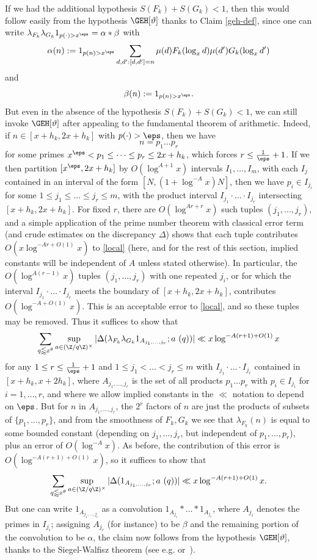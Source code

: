 If we had the additional hypothesis $S(F_k) + S(G_k) < 1$, then this would follow easily from the hypothesis $\GEH[\vartheta]$ thanks to Claim \ref{geh-def}, since one can write $\lambda_{F_k} \lambda_{G_k} 1_{p(\cdot) > x^\eps} = \alpha \ast \beta$ with
$$ \alpha(n) := 1_{p(n) > x^\eps} \sum_{d,d': [d,d'] = n} \mu(d) F_k(\log_x d) \mu(d') G_k(\log_x d')$$
and
$$ \beta(n) := 1_{p(n) > x^\eps}.$$
But even in the absence of the hypothesis $S(F_k) + S(G_k) < 1$, we can still invoke $\GEH[\vartheta]$ after appealing to the fundamental theorem of arithmetic.  Indeed, if $n \in [x+h_k,2x+h_k]$ with $p(\cdot) > \eps$, then we have
$$ n = p_1 \dots p_r$$
for some primes $x^\eps < p_1 \leq \dots \leq p_r \leq 2x+h_k$, which forces $r \leq \frac{1}{\eps}+1$.  If we then partition $[x^\eps,2x+h_k]$ by $O( \log^{A+1} x )$ intervals $I_1,\dots,I_m$, with each $I_j$ contained in an interval of the form $[N, (1+\log^{-A} x) N]$, then we have $p_i \in I_{j_i}$ for some $1 \leq j_1 \leq \dots \leq j_r \leq m$, with the product interval $I_{j_1} \cdot \dots \cdot I_{j_r}$ intersecting $[x+h_k, 2x+h_k]$.  For fixed $r$, there are $O( \log^{Ar+r} x)$ such tuples $(j_1,\dots,j_r)$, and a simple application of the prime number theorem with classical error term (and crude estimates on the discrepancy $\Delta$) shows that each tuple contributes $O( x \log^{-Ar+O(1)} x)$ to \eqref{local} (here, and for the rest of this section, implied constants will be independent of $A$ unless stated otherwise). In particular, the $O(\log^{A(r-1)}{x})$ tuples $(j_1,\dots,j_r)$ with one repeated $j_i$, or for which the interval $I_{j_1} \cdot \dots \cdot I_{j_r}$ meets the boundary of $[x+h_k, 2x+h_k]$, contributes $O(\log^{-A+O(1)}{x})$. This is an acceptable error to \eqref{local}, and so these tuples may be removed.  Thus it suffices to show that 
$$
\sum_{q \lessapprox x^\theta} \sup_{a \in (\Z/q\Z)^\times} |\Delta( \lambda_{F_k} \lambda_{G_k} 1_{A_{j_1,\dots,j_r}};  a\ (q))| \ll x \log^{-A(r+1)+O(1)} x
$$
for any $1 \leq r \leq \frac{1}{\eps}+1$ and $1 \leq j_1 < \dots < j_r \leq m$ with $I_{j_1} \cdot \dots \cdot I_{j_r}$ contained in $[x+h_k,x+2h_k]$, where $A_{j_1,\dots,j_r}$ is the set of all products $p_1 \dots p_r$ with $p_i \in I_{j_i}$ for $i=1,\dots,r$, and where we allow implied constants in the $\ll$ notation to depend on $\eps$.  But for $n$ in $A_{j_1,\dots,j_r}$, the $2^r$ factors of $n$ are just the products of subsets of $\{p_1,\dots,p_r\}$, and from the smoothness of $F_k,G_k$ we see that $\lambda_{F_k}(n)$ is equal to some bounded constant (depending on $j_1,\dots,j_r$, but independent of $p_1,\dots,p_r$), plus an error of $O(\log^{-A} x)$.  As before, the contribution of this error is $O( \log^{-A(r+1)+O(1)} x)$, so it suffices to show that
$$
\sum_{q \lessapprox x^\theta} \sup_{a \in (\Z/q\Z)^\times} |\Delta( 1_{A_{j_1,\dots,j_r}};  a\ (q))| \ll x \log^{-A(r+1)+O(1)} x.
$$
But one can write $1_{A_{j_1,\dots,j_r}}$ as a convolution $1_{A_{j_1}} \ast \dots \ast 1_{A_{j_r}}$, where $A_{j_i}$ denotes the primes in $I_{j_i}$; assigning $A_{j_r}$ (for instance) to be $\beta$ and the remaining portion of the convolution to be $\alpha$, the claim now follows from the hypothesis $\GEH[\vartheta]$, thanks to the Siegel-Walfisz theorem (see e.g. \cite[Satz 4]{siebert} or~\cite[Th. 5.29]{ik}).

